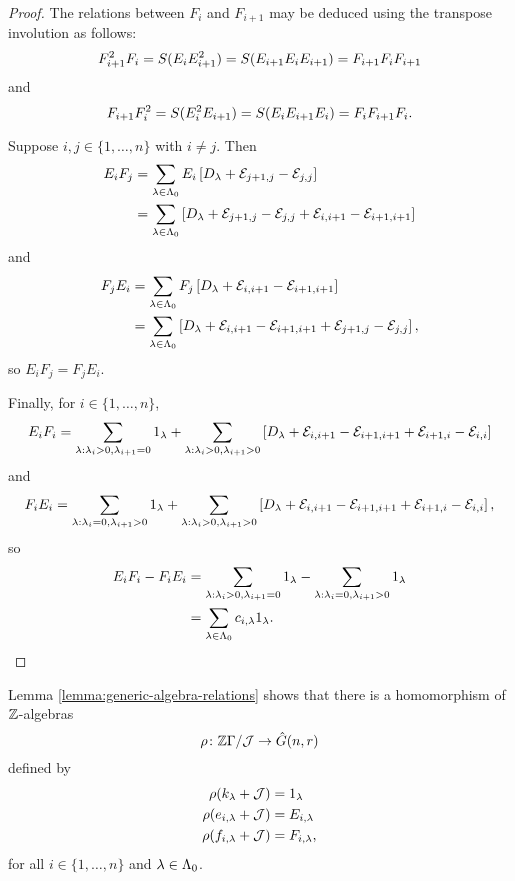 \documentclass[a4paper, 11pt]{report}
\begin{document}
\begin{proof}
The relations between $F_i$ and $F_{i+1}$ may be deduced using the transpose involution as follows:
\begin{equation*}
F_{i+1}^2F_i = S{(E_iE_{i+1}^2)} = S{(E_{i+1}E_iE_{i+1})} = F_{i+1}F_iF_{i+1}
\end{equation*}
and
\begin{equation*}
F_{i+1}F_i^2 = S{(E_i^2E_{i+1})} = S{(E_iE_{i+1}E_i)} = F_iF_{i+1}F_i.
\end{equation*}

Suppose $i,j\in\{1,\ldots,n\}$ with $i\neq j$. Then
\begin{align*}
E_iF_j &= \sum_{\lambda\in\Lambda_0{}} E_i\left[D_{\lambda}+\mathcal{E}_{j+1,j}-\mathcal{E}_{j,j}\right]\\
&= \sum_{\lambda\in\Lambda_0{}} \left[D_{\lambda}+\mathcal{E}_{j+1,j}-\mathcal{E}_{j,j}+\mathcal{E}_{i,i+1}-\mathcal{E}_{i+1,i+1}\right]
\end{align*}
and
\begin{align*}
F_jE_i &= \sum_{\lambda\in\Lambda_0{}} F_j\left[D_{\lambda}+\mathcal{E}_{i,i+1}-\mathcal{E}_{i+1,i+1}\right]\\
&= \sum_{\lambda\in\Lambda_0{}} \left[D_{\lambda}+\mathcal{E}_{i,i+1}-\mathcal{E}_{i+1,i+1}+\mathcal{E}_{j+1,j}-\mathcal{E}_{j,j}\right],
\end{align*}
so $E_iF_j=F_jE_i$.

Finally, for $i\in\{1,\ldots,n\}$,
\begin{equation*}
E_iF_i = \sum_{\lambda:\lambda_i>0,\lambda_{i+1}=0}1_\lambda +\sum_{\lambda:\lambda_i>0,\lambda_{i+1}>0}\left[D_{\lambda}+\mathcal{E}_{i,i+1}-\mathcal{E}_{i+1,i+1}+\mathcal{E}_{i+1,i}-\mathcal{E}_{i,i}\right]
\end{equation*}
and
\begin{equation*}
F_iE_i = \sum_{\lambda:\lambda_i=0,\lambda_{i+1}>0}1_\lambda +\sum_{\lambda:\lambda_i>0,\lambda_{i+1}>0}\left[D_{\lambda}+\mathcal{E}_{i,i+1}-\mathcal{E}_{i+1,i+1}+\mathcal{E}_{i+1,i}-\mathcal{E}_{i,i}\right],
\end{equation*}
so
\begin{align*}
E_iF_i-F_iE_i &= \sum_{\lambda:\lambda_i>0,\lambda_{i+1}=0}1_\lambda -\sum_{\lambda:\lambda_i=0,\lambda_{i+1}>0}1_\lambda\\
&= \sum_{\lambda\in\Lambda_0{}} c_{i,\lambda}1_\lambda.
\end{align*}
\end{proof}


Lemma \ref{lemma:generic-algebra-relations} shows that there is a homomorphism of $\mathbb{Z}$-algebras
\begin{equation*}
\rho\colon\mathbb{Z}\Gamma/{\mathcal{J}}\to\hat{G}(n,r)
\end{equation*}
defined by
\begin{align*}
\rho(k_\lambda +\mathcal{J}) &= 1_\lambda\\
\rho(e_{i,\lambda} +\mathcal{J}) &= E_{i,\lambda}\\
\rho(f_{i,\lambda} +\mathcal{J}) &= F_{i,\lambda},
\end{align*}
for all $i\in\{1,\ldots,n\}$ and $\lambda\in\Lambda_0{}$.
\end{document}
